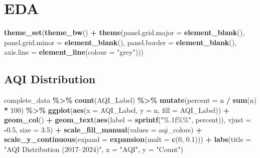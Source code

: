 \documentclass[
]{article}
\newenvironment{Shaded}{\begin{snugshade}}{\end{snugshade}}
\newcommand{\AttributeTok}[1]{\textcolor[rgb]{0.13,0.29,0.53}{#1}}
\newcommand{\DecValTok}[1]{\textcolor[rgb]{0.00,0.00,0.81}{#1}}
\newcommand{\FloatTok}[1]{\textcolor[rgb]{0.00,0.00,0.81}{#1}}
\newcommand{\FunctionTok}[1]{\textcolor[rgb]{0.13,0.29,0.53}{\textbf{#1}}}
\newcommand{\NormalTok}[1]{#1}
\newcommand{\SpecialCharTok}[1]{\textcolor[rgb]{0.81,0.36,0.00}{\textbf{#1}}}
\newcommand{\StringTok}[1]{\textcolor[rgb]{0.31,0.60,0.02}{#1}}
\begin{document}
\section{EDA}\label{eda}

\begin{Shaded}
\begin{Highlighting}[]
\FunctionTok{theme\_set}\NormalTok{(}\FunctionTok{theme\_bw}\NormalTok{() }\SpecialCharTok{+} 
  \FunctionTok{theme}\NormalTok{(}\AttributeTok{panel.grid.major =} \FunctionTok{element\_blank}\NormalTok{(), }
        \AttributeTok{panel.grid.minor =} \FunctionTok{element\_blank}\NormalTok{(),}
        \AttributeTok{panel.border =} \FunctionTok{element\_blank}\NormalTok{(),}
        \AttributeTok{axis.line =} \FunctionTok{element\_line}\NormalTok{(}\AttributeTok{colour =} \StringTok{"grey"}\NormalTok{))) }
\end{Highlighting}
\end{Shaded}

\subsection{AQI Distribution}\label{aqi-distribution}

\begin{Shaded}
\begin{Highlighting}[]
\NormalTok{complete\_data }\SpecialCharTok{\%\textgreater{}\%}
  \FunctionTok{count}\NormalTok{(AQI\_Label) }\SpecialCharTok{\%\textgreater{}\%}
  \FunctionTok{mutate}\NormalTok{(}\AttributeTok{percent =}\NormalTok{ n }\SpecialCharTok{/} \FunctionTok{sum}\NormalTok{(n) }\SpecialCharTok{*} \DecValTok{100}\NormalTok{) }\SpecialCharTok{\%\textgreater{}\%}
  \FunctionTok{ggplot}\NormalTok{(}\FunctionTok{aes}\NormalTok{(}\AttributeTok{x =}\NormalTok{ AQI\_Label, }\AttributeTok{y =}\NormalTok{ n, }\AttributeTok{fill =}\NormalTok{ AQI\_Label)) }\SpecialCharTok{+}
  \FunctionTok{geom\_col}\NormalTok{() }\SpecialCharTok{+}
  \FunctionTok{geom\_text}\NormalTok{(}\FunctionTok{aes}\NormalTok{(}\AttributeTok{label =} \FunctionTok{sprintf}\NormalTok{(}\StringTok{"\%.1f\%\%"}\NormalTok{, percent)), }\AttributeTok{vjust =} \SpecialCharTok{{-}}\FloatTok{0.5}\NormalTok{, }\AttributeTok{size =} \FloatTok{3.5}\NormalTok{) }\SpecialCharTok{+}
  \FunctionTok{scale\_fill\_manual}\NormalTok{(}\AttributeTok{values =}\NormalTok{ aqi\_colors) }\SpecialCharTok{+}
  \FunctionTok{scale\_y\_continuous}\NormalTok{(}\AttributeTok{expand =} \FunctionTok{expansion}\NormalTok{(}\AttributeTok{mult =} \FunctionTok{c}\NormalTok{(}\DecValTok{0}\NormalTok{, }\FloatTok{0.1}\NormalTok{))) }\SpecialCharTok{+}
  \FunctionTok{labs}\NormalTok{(}\AttributeTok{title =} \StringTok{"AQI Distribution (2017–2024)"}\NormalTok{, }\AttributeTok{x =} \StringTok{"AQI"}\NormalTok{, }\AttributeTok{y =} \StringTok{"Count"}\NormalTok{)}
\end{Highlighting}
\end{Shaded}
\end{document}
